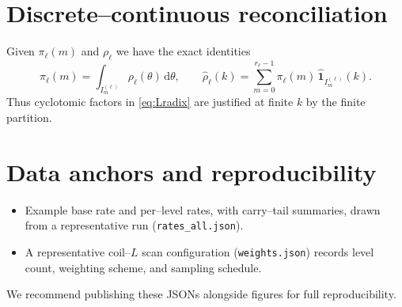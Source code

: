 \documentclass[11pt]{article}
\newcommand{\ud}{\mathrm{d}}
\begin{document}
\section{Discrete--continuous reconciliation}
Given $\pi_\ell(m)$ and $\rho_\ell$ we have the exact identities
\begin{equation}
\pi_\ell(m)=\int_{I_m^{(\ell)}}\rho_\ell(\theta)\,\ud\theta,\qquad
\widehat{\rho}_\ell(k)=\sum_{m=0}^{r_\ell-1}\pi_\ell(m)\,\widehat{\mathbf{1}}_{I_m^{(\ell)}}(k).
\end{equation}
Thus cyclotomic factors in \eqref{eq:Lradix} are justified at finite $k$ by the finite partition.

\section*{Data anchors and reproducibility}
\begin{itemize}
\item Example base rate and per--level rates, with carry--tail summaries, drawn from a representative run (\texttt{rates\_all.json}).
\item A representative coil--$L$ scan configuration (\texttt{weights.json}) records level count, weighting scheme, and sampling schedule.
\end{itemize}
We recommend publishing these JSONs alongside figures for full reproducibility.
\end{document}

